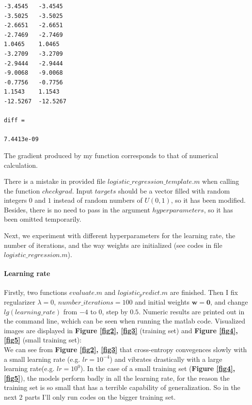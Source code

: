 \documentclass{article}
\begin{document}
\begin{commandline}
	\begin{verbatim}
-3.4545   -3.4545
-3.5025   -3.5025
-2.6651   -2.6651
-2.7469   -2.7469
1.0465    1.0465
-3.2709   -3.2709
-2.9444   -2.9444
-9.0068   -9.0068
-0.7756   -0.7756
1.1543    1.1543
-12.5267  -12.5267

diff =

7.4413e-09
	\end{verbatim}
\end{commandline}

The gradient produced by my function corresponds to that of numerical calculation.

\begin{warn}[Notice:]
	There is a mistake in provided file $logistic\_regression\_template.m$ when calling the function $checkgrad$. Input $targets$ should be a vector filled with random integers $0$ and $1$ instead of random numbers of $U(0,1)$, so it has been modified. Besides, there is no need to pass in the argument $hyperparameters$, so it has been omitted temporarily.
\end{warn}

Next, we experiment with different hyperparameters
for the learning rate, the number of iterations, and the way weights are initialized (see codes in file $logistic\_regression.m$).\\

\paragraph{Learning rate}
Firstly, two functions $evaluate.m$ and $logistic_predict.m$ are finished. Then I fix regularizer $\lambda=0$, $number\_iterations = 100$ and initial weights $\bm{w=0}$, and change $lg(learning\_rate)$ from $-4$ to $0$, step by $0.5$. Numeric results are printed out in the command line, wchich can be seen when running the matlab code. Visualized images are displayed in \textbf{Figure \ref{fig2}, \ref{fig3}} (training set) and \textbf{Figure \ref{fig4}, \ref{fig5}} (small training set):\\

We can see from \textbf{Figure \ref{fig2}, \ref{fig3}} that cross-entropy convegences slowly with a small learning rate (e.g. $lr=10^{-4}$) and vibrates drastically with a large learning rate(e.g. $lr=10^{0}$). In the case of a small training set (\textbf{Figure \ref{fig4}, \ref{fig5}}), the models perform badly in all the learning rate, for the reason the training set is so small that has a terrible capability of generalization. So in the next 2 parts I'll only run codes on the bigger training set.\\
\end{document}
